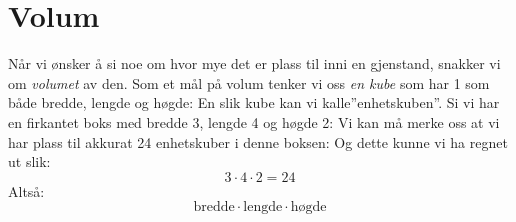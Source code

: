 \section{Volum}
Når vi ønsker å si noe om hvor mye det er plass til inni en gjenstand, snakker vi om \textit{volumet} av den. Som et mål på volum tenker vi oss \textit{en kube} som har 1 som både bredde, lengde og høgde:
En slik kube kan vi kalle''enhetskuben''. Si vi har en firkantet boks med bredde 3, lengde 4 og høgde 2:
Vi kan må merke oss at vi har plass til akkurat 24 enhetskuber i denne boksen:
Og dette kunne vi ha regnet ut slik:
\[ 3\cdot 4\cdot 2=24\]
Altså:
\[\text{bredde}\cdot\text{lengde}\cdot\text{høgde} \]\vsk


